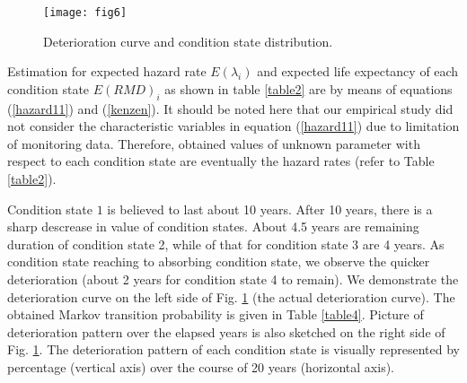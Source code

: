 \documentclass[a4paper,oneside,onecolumn,preprint,10pt,authoryear]{elsarticle}
\begin{document}
\begin{figure}%
\begin{center}
\begin{footnotesize}
\texttt{[image: fig6]}\\
\end{footnotesize}
\end{center}
\caption{Deterioration curve and condition state distribution.}
\label{fig6}
\end{figure}

Estimation for expected hazard rate $E(\lambda_i)$ and expected life expectancy of each condition state $E(RMD)_i$ as shown in table \ref{table2} are by means of equations (\ref{hazard11}) and (\ref{kenzen}). It should be noted here that our empirical study did not consider the characteristic variables in equation (\ref{hazard11}) due to limitation of monitoring data. Therefore, obtained values of unknown parameter with respect to each condition state are eventually the hazard rates (refer to Table \ref{table2}). 

Condition state $1$ is believed to last about 10 years. After 10 years, there is a sharp descrease in value of condition states. About 4.5 years are remaining duration of condition state 2, while of that for condition state 3 are 4 years. As condition state reaching to absorbing condition state, we observe the quicker deterioration (about 2 years for condition state 4 to remain). We demonstrate the deterioration curve on the left side of Fig. \ref{fig6} (the actual deterioration curve). The obtained Markov transition probability is given in Table \ref{table4}. Picture of deterioration pattern over the elapsed years is also sketched on the right side of Fig. \ref{fig6}. The deterioration pattern of each condition state is visually represented by percentage (vertical axis) over the course of 20 years (horizontal axis).

\end{document}
